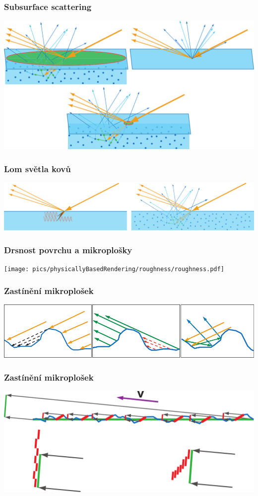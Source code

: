 \begin{frame}
    \frametitle{Subsurface scattering}
    \includegraphics[width=\textwidth]{pics/physicallyBasedRendering/subsurface_pixel_size}
\end{frame}

\begin{frame}
    \frametitle{Lom světla kovů}
    \includegraphics[width=\textwidth]{pics/physicallyBasedRendering/metal_refraction}
\end{frame}

\begin{frame}
    \frametitle{Drsnost povrchu a mikroplošky}
    \texttt{[image: pics/physicallyBasedRendering/roughness/roughness.pdf]}
\end{frame}

\begin{frame}
    \frametitle{Zastínění mikroplošek}
    \includegraphics[width=\textwidth]{pics/physicallyBasedRendering/microfacets_occlusion}
\end{frame}

\begin{frame}
    \frametitle{Zastínění mikroplošek}
    \includegraphics[width=\textwidth]{pics/physicallyBasedRendering/microfacet_masking}
\end{frame}



